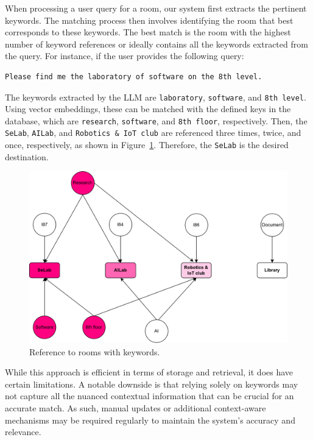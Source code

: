 When processing a user query for a room, our system first extracts the pertinent keywords. The matching process then involves identifying the room that best corresponds to these keywords. The best match is the room with the highest number of keyword references or ideally contains all the keywords extracted from the query. For instance, if the user provides the following query:

\begin{lstlisting}[style=cSharp]
Please find me the laboratory of software on the 8th level.
\end{lstlisting}

The keywords extracted by the LLM are \texttt{laboratory}, \texttt{software}, and \texttt{8th level}. Using vector embeddings, these can be matched with the defined keys in the database, which are \texttt{research}, \texttt{software}, and \texttt{8th floor}, respectively. Then, the \texttt{SeLab}, \texttt{AILab}, and \texttt{Robotics \& IoT club} are referenced three times, twice, and once, respectively, as shown in Figure~\ref{fig:data-management-2}. Therefore, the \texttt{SeLab} is the desired destination.

\begin{figure}[ht]
  \centering
  \includegraphics[scale=0.3]{content/resources/images/chap-problems-solutions/data-management-2.png}
  \caption{Reference to rooms with keywords.}
  \label{fig:data-management-2}
\end{figure}

While this approach is efficient in terms of storage and retrieval, it does have certain limitations. A notable downside is that relying solely on keywords may not capture all the nuanced contextual information that can be crucial for an accurate match. As such, manual updates or additional context-aware mechanisms may be required regularly to maintain the system’s accuracy and relevance.

